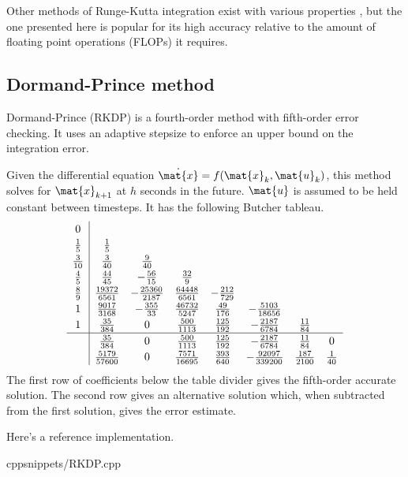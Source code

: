 Other methods of Runge-Kutta integration exist with various properties
\cite{bib:wiki_rk4}, but the one presented here is popular for its high accuracy
relative to the amount of floating point operations (FLOPs) it requires.

\subsection{Dormand-Prince method}

Dormand-Prince (RKDP) is a fourth-order method with fifth-order error checking.
It uses an adaptive stepsize to enforce an upper bound on the integration error.
\begin{theorem}
  Given the differential equation $\dot{\mat{x}} = f(\mat{x}_k, \mat{u}_k)$,
  this method solves for $\mat{x}_{k+1}$ at $h$ seconds in the future.
  $\mat{u}$ is assumed to be held constant between timesteps. It has the
  following Butcher tableau.
  \begin{equation*}
    \renewcommand\arraystretch{1.2}
    \begin{array}{c|ccccccc}
      0 \\
      \frac{1}{5} & \frac{1}{5} \\
      \frac{3}{10} & \frac{3}{40} & \frac{9}{40} \\
      \frac{4}{5} & \frac{44}{45} & -\frac{56}{15} & \frac{32}{9} \\
      \frac{8}{9} & \frac{19372}{6561} & -\frac{25360}{2187} &
        \frac{64448}{6561} & -\frac{212}{729} \\
      1 & \frac{9017}{3168} & -\frac{355}{33} & \frac{46732}{5247} &
        \frac{49}{176} & -\frac{5103}{18656} \\
      1 & \frac{35}{384} & 0 & \frac{500}{1113} & \frac{125}{192} &
        -\frac{2187}{6784} & \frac{11}{84} \\
      \hline
      & \frac{35}{384} & 0 & \frac{500}{1113} & \frac{125}{192} &
        -\frac{2187}{6784} & \frac{11}{84} & 0 \\
      & \frac{5179}{57600} & 0 & \frac{7571}{16695} & \frac{393}{640} &
        -\frac{92097}{339200} & \frac{187}{2100} & \frac{1}{40}
    \end{array}
  \end{equation*}
  The first row of coefficients below the table divider gives the fifth-order
  accurate solution. The second row gives an alternative solution which,
  when subtracted from the first solution, gives the error estimate.
\end{theorem}

Here's a reference implementation.
\begin{coderemote}{cpp}{snippets/RKDP.cpp}
  \caption{RKDP implementation in C++}
\end{coderemote}
